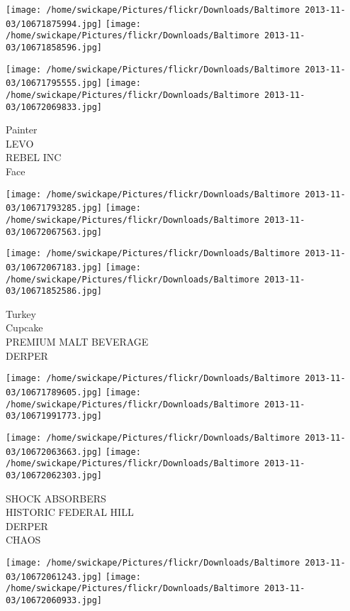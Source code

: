 \documentclass[10pt,letterpaper]{article}
\begin{document}
\texttt{[image: /home/swickape/Pictures/flickr/Downloads/Baltimore 2013-11-03/10671875994.jpg]}
\texttt{[image: /home/swickape/Pictures/flickr/Downloads/Baltimore 2013-11-03/10671858596.jpg]}

\texttt{[image: /home/swickape/Pictures/flickr/Downloads/Baltimore 2013-11-03/10671795555.jpg]}
\texttt{[image: /home/swickape/Pictures/flickr/Downloads/Baltimore 2013-11-03/10672069833.jpg]}

Painter\\
LEVO\\
REBEL INC\\
Face\\
\pagebreak

\texttt{[image: /home/swickape/Pictures/flickr/Downloads/Baltimore 2013-11-03/10671793285.jpg]}
\texttt{[image: /home/swickape/Pictures/flickr/Downloads/Baltimore 2013-11-03/10672067563.jpg]}

\texttt{[image: /home/swickape/Pictures/flickr/Downloads/Baltimore 2013-11-03/10672067183.jpg]}
\texttt{[image: /home/swickape/Pictures/flickr/Downloads/Baltimore 2013-11-03/10671852586.jpg]}

Turkey\\
Cupcake\\
PREMIUM MALT BEVERAGE\\
DERPER\\
\pagebreak

\texttt{[image: /home/swickape/Pictures/flickr/Downloads/Baltimore 2013-11-03/10671789605.jpg]}
\texttt{[image: /home/swickape/Pictures/flickr/Downloads/Baltimore 2013-11-03/10671991773.jpg]}

\texttt{[image: /home/swickape/Pictures/flickr/Downloads/Baltimore 2013-11-03/10672063663.jpg]}
\texttt{[image: /home/swickape/Pictures/flickr/Downloads/Baltimore 2013-11-03/10672062303.jpg]}

SHOCK ABSORBERS\\
HISTORIC FEDERAL HILL\\
DERPER\\
CHAOS\\
\pagebreak

\texttt{[image: /home/swickape/Pictures/flickr/Downloads/Baltimore 2013-11-03/10672061243.jpg]}
\texttt{[image: /home/swickape/Pictures/flickr/Downloads/Baltimore 2013-11-03/10672060933.jpg]}
\end{document}
